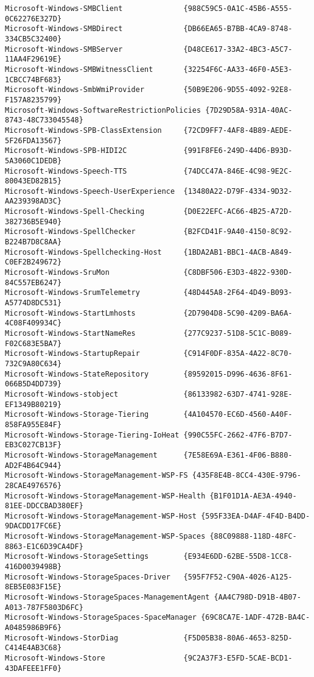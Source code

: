 \documentclass{report}
\begin{document}
\begin{lstlisting}[breaklines=true,basicstyle=\tiny]
Microsoft-Windows-SMBClient              {988C59C5-0A1C-45B6-A555-0C62276E327D}
Microsoft-Windows-SMBDirect              {DB66EA65-B7BB-4CA9-8748-334CB5C32400}
Microsoft-Windows-SMBServer              {D48CE617-33A2-4BC3-A5C7-11AA4F29619E}
Microsoft-Windows-SMBWitnessClient       {32254F6C-AA33-46F0-A5E3-1CBCC74BF683}
Microsoft-Windows-SmbWmiProvider         {50B9E206-9D55-4092-92E8-F157A8235799}
Microsoft-Windows-SoftwareRestrictionPolicies {7D29D58A-931A-40AC-8743-48C733045548}
Microsoft-Windows-SPB-ClassExtension     {72CD9FF7-4AF8-4B89-AEDE-5F26FDA13567}
Microsoft-Windows-SPB-HIDI2C             {991F8FE6-249D-44D6-B93D-5A3060C1DEDB}
Microsoft-Windows-Speech-TTS             {74DCC47A-846E-4C98-9E2C-80043ED82B15}
Microsoft-Windows-Speech-UserExperience  {13480A22-D79F-4334-9D32-AA239398AD3C}
Microsoft-Windows-Spell-Checking         {D0E22EFC-AC66-4B25-A72D-382736B5E940}
Microsoft-Windows-SpellChecker           {B2FCD41F-9A40-4150-8C92-B224B7D8C8AA}
Microsoft-Windows-Spellchecking-Host     {1BDA2AB1-BBC1-4ACB-A849-C0EF2B249672}
Microsoft-Windows-SruMon                 {C8DBF506-E3D3-4822-930D-84C557EB6247}
Microsoft-Windows-SrumTelemetry          {48D445A8-2F64-4D49-B093-A5774D8DC531}
Microsoft-Windows-StartLmhosts           {2D7904D8-5C90-4209-BA6A-4C08F409934C}
Microsoft-Windows-StartNameRes           {277C9237-51D8-5C1C-B089-F02C683E5BA7}
Microsoft-Windows-StartupRepair          {C914F0DF-835A-4A22-8C70-732C9A80C634}
Microsoft-Windows-StateRepository        {89592015-D996-4636-8F61-066B5D4DD739}
Microsoft-Windows-stobject               {86133982-63D7-4741-928E-EF1349B80219}
Microsoft-Windows-Storage-Tiering        {4A104570-EC6D-4560-A40F-858FA955E84F}
Microsoft-Windows-Storage-Tiering-IoHeat {990C55FC-2662-47F6-B7D7-EB3C027CB13F}
Microsoft-Windows-StorageManagement      {7E58E69A-E361-4F06-B880-AD2F4B64C944}
Microsoft-Windows-StorageManagement-WSP-FS {435F8E4B-8CC4-430E-9796-28CAE4976576}
Microsoft-Windows-StorageManagement-WSP-Health {B1F01D1A-AE3A-4940-81EE-DDCCBAD380EF}
Microsoft-Windows-StorageManagement-WSP-Host {595F33EA-D4AF-4F4D-B4DD-9DACDD17FC6E}
Microsoft-Windows-StorageManagement-WSP-Spaces {88C09888-118D-48FC-8863-E1C6D39CA4DF}
Microsoft-Windows-StorageSettings        {E934E6DD-62BE-55D8-1CC8-416D0039498B}
Microsoft-Windows-StorageSpaces-Driver   {595F7F52-C90A-4026-A125-8EB5E083F15E}
Microsoft-Windows-StorageSpaces-ManagementAgent {AA4C798D-D91B-4B07-A013-787F5803D6FC}
Microsoft-Windows-StorageSpaces-SpaceManager {69C8CA7E-1ADF-472B-BA4C-A0485986B9F6}
Microsoft-Windows-StorDiag               {F5D05B38-80A6-4653-825D-C414E4AB3C68}
Microsoft-Windows-Store                  {9C2A37F3-E5FD-5CAE-BCD1-43DAFEEE1FF0}

\end{lstlisting}
\end{document}
